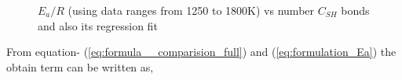 \documentclass[preprint,12pt]{elsarticle}
\begin{document}
		\begin{figure}[H]\label{fig:Ea_Half}
			{
				\hspace{0.25cm}
				\caption{$E_a/R$ (using data ranges from 1250 to 1800K) vs number $C_{SH}$ bonds and also its regression fit}
			}
		\end{figure}
		
			From equation- (\ref{eq:formula__comparision_full}) and (\ref{eq:formulation_Ea}) the obtain term can be written as,
			
\end{document}
